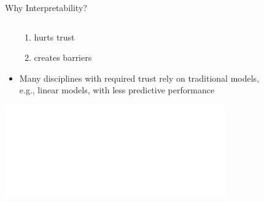 \documentclass[11pt,compress,t,notes=noshow, aspectratio=169, xcolor=table]{beamer}
\begin{document}
\begin{frame}{Why Interpretability?}
\begin{columns}[T, totalwidth=\textwidth]
\begin{column}{0.8\textwidth}
\begin{itemize}
{\begin{enumerate}
				\item hurts trust
				\item creates barriers
			\end{enumerate}}
			\item<4->[\,$\leadsto$] Many disciplines with required trust rely on traditional models,\\ e.g., linear models, with less predictive performance   
		\end{itemize}
    \centering\includegraphics<4->[width=0.8\textwidth]{figure/performance_vs_interpretability.pdf}
	\end{column}
	\begin{column}{0.2\textwidth}  %
        \centering

\end{column}
\end{columns}
\end{frame}
\end{document}

